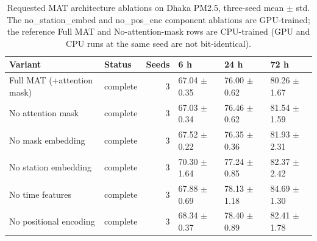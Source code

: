 \begin{table}
\caption{Requested MAT architecture ablations on Dhaka PM2.5, three-seed mean $\pm$ std. The no\_station\_embed and no\_pos\_enc component ablations are GPU-trained; the reference Full MAT and No-attention-mask rows are CPU-trained (GPU and CPU runs at the same seed are not bit-identical).}
\label{tab:requested_arch_ablations}
\begin{tabular}{llrlll}
\toprule
Variant & Status & Seeds & 6 h & 24 h & 72 h \\
\midrule
Full MAT (+attention mask) & complete & 3 & 67.04 $\pm$ 0.35 & 76.00 $\pm$ 0.62 & 80.26 $\pm$ 1.67 \\
No attention mask & complete & 3 & 67.03 $\pm$ 0.34 & 76.46 $\pm$ 0.62 & 81.54 $\pm$ 1.59 \\
No mask embedding & complete & 3 & 67.52 $\pm$ 0.22 & 76.35 $\pm$ 0.36 & 81.93 $\pm$ 2.31 \\
No station embedding & complete & 3 & 70.30 $\pm$ 1.64 & 77.24 $\pm$ 0.85 & 82.37 $\pm$ 2.42 \\
No time features & complete & 3 & 67.88 $\pm$ 0.69 & 78.13 $\pm$ 1.18 & 84.69 $\pm$ 1.30 \\
No positional encoding & complete & 3 & 68.34 $\pm$ 0.37 & 78.40 $\pm$ 0.89 & 82.41 $\pm$ 1.78 \\
\bottomrule
\end{tabular}
\end{table}
